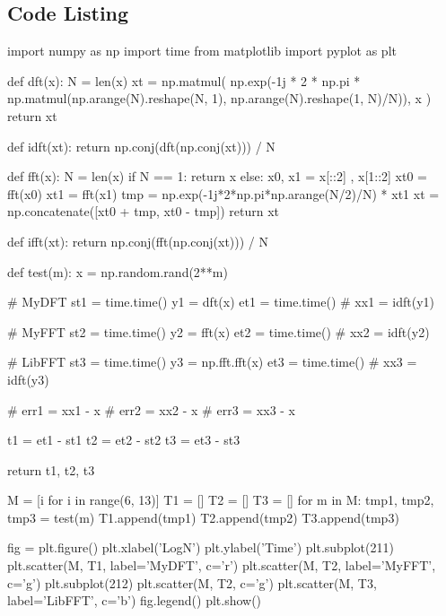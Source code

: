 \documentclass{article}
\begin{document}
\begin{appendices}
\section{Code Listing}
\begin{python}
import numpy as np
import time
from matplotlib import pyplot as plt

def dft(x):
    N = len(x)
    xt = np.matmul(
        np.exp(-1j * 2 * np.pi * np.matmul(np.arange(N).reshape(N, 1), np.arange(N).reshape(1, N)/N)),
        x
        )
    return xt

def idft(xt):
    return np.conj(dft(np.conj(xt))) / N

def fft(x):
    N = len(x)
    if N == 1:
        return x
    else:
        x0, x1 = x[::2] , x[1::2]
        xt0 = fft(x0)
        xt1 = fft(x1)
        tmp = np.exp(-1j*2*np.pi*np.arange(N/2)/N) * xt1
        xt = np.concatenate([xt0 + tmp, xt0 - tmp])
    return xt

def ifft(xt):
    return np.conj(fft(np.conj(xt))) / N

def test(m):
    x = np.random.rand(2**m)

    # MyDFT
    st1 = time.time()
    y1 = dft(x)
    et1 = time.time()
    # xx1 = idft(y1)

    # MyFFT
    st2 = time.time()
    y2 = fft(x)
    et2 = time.time()
    # xx2 = idft(y2)

    # LibFFT
    st3 = time.time()
    y3 = np.fft.fft(x)
    et3 = time.time()
    # xx3 = idft(y3)

    # err1 = xx1 - x
    # err2 = xx2 - x
    # err3 = xx3 - x

    t1 = et1 - st1
    t2 = et2 - st2
    t3 = et3 - st3
    
    return t1, t2, t3


M = [i for i in range(6, 13)]
T1 = []
T2 = []
T3 = []
for m in M:
    tmp1, tmp2, tmp3 = test(m)
    T1.append(tmp1)
    T2.append(tmp2)
    T3.append(tmp3)

fig = plt.figure()
plt.xlabel('LogN')
plt.ylabel('Time')
plt.subplot(211)
plt.scatter(M, T1, label='MyDFT', c='r')
plt.scatter(M, T2, label='MyFFT', c='g')
plt.subplot(212)
plt.scatter(M, T2, c='g')
plt.scatter(M, T3, label='LibFFT', c='b')
fig.legend()
plt.show()
\end{python}
\end{appendices}
\end{document}
